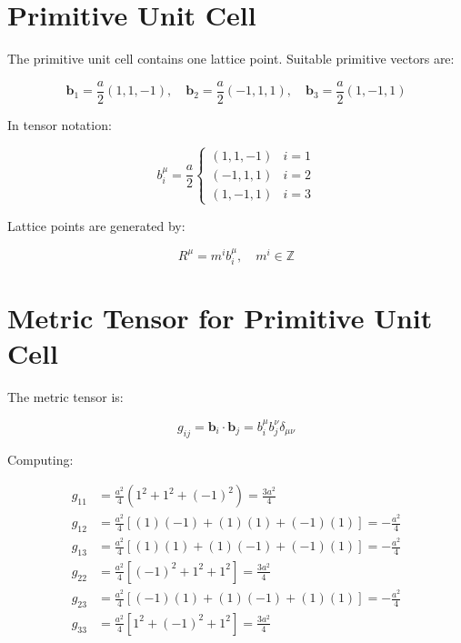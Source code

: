 \documentclass[a4paper,12pt]{article}
\newcommand{\bvec}[1]{\mathbf{#1}} %
\newcommand{\delt}{\delta} %
\begin{document}
	\section{Primitive Unit Cell}
	
	The primitive unit cell contains one lattice point. Suitable primitive vectors are:
	
	\begin{equation}
		\bvec{b}_1 = \frac{a}{2} (1, 1, -1), \quad \bvec{b}_2 = \frac{a}{2} (-1, 1, 1), \quad \bvec{b}_3 = \frac{a}{2} (1, -1, 1)
	\end{equation}
	
	In tensor notation:
	
	\begin{equation}
		b_i^\mu = \frac{a}{2} \begin{cases}
			(1, 1, -1) & i = 1 \\
			(-1, 1, 1) & i = 2 \\
			(1, -1, 1) & i = 3
		\end{cases}
	\end{equation}
	
	Lattice points are generated by:
	
	\begin{equation}
		R^\mu = m^i b_i^\mu, \quad m^i \in \mathbb{Z}
	\end{equation}
	
	\section{Metric Tensor for Primitive Unit Cell}
	
	The metric tensor is:
	
	\begin{equation}
		g_{ij} = \bvec{b}_i \cdot \bvec{b}_j = b_i^\mu b_j^\nu \delt_{\mu\nu}
	\end{equation}
	
	Computing:
	
	\begin{align}
		g_{11} &= \frac{a^2}{4} (1^2 + 1^2 + (-1)^2) = \frac{3a^2}{4} \\
		g_{12} &= \frac{a^2}{4} [(1)(-1) + (1)(1) + (-1)(1)] = -\frac{a^2}{4} \\
		g_{13} &= \frac{a^2}{4} [(1)(1) + (1)(-1) + (-1)(1)] = -\frac{a^2}{4} \\
		g_{22} &= \frac{a^2}{4} [(-1)^2 + 1^2 + 1^2] = \frac{3a^2}{4} \\
		g_{23} &= \frac{a^2}{4} [(-1)(1) + (1)(-1) + (1)(1)] = -\frac{a^2}{4} \\
		g_{33} &= \frac{a^2}{4} [1^2 + (-1)^2 + 1^2] = \frac{3a^2}{4}
	\end{align}
	
\end{document}
